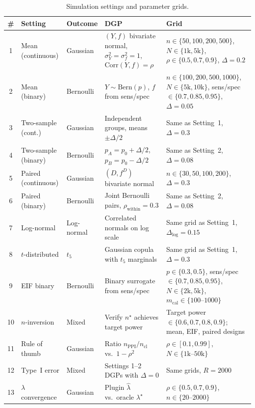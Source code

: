 \documentclass[11pt]{article}
\newcommand{\Corr}{\mathrm{Corr}}
\begin{document}
\begin{table}[!ht]
\centering\small
\begin{tabular}{|c|p{2.0cm}|p{1.8cm}|p{5.6cm}|p{3.2cm}|}
\hline
\textbf{\#} & \textbf{Setting} & \textbf{Outcome} & \textbf{DGP} &
  \textbf{Grid} \\
\hline
1 & Mean (continuous) & Gaussian &
  $(Y,f)$ bivariate normal, $\sigma_Y^2{=}\sigma_f^2{=}1$,
  $\Corr(Y,f){=}\rho$ &
  $n{\in}\{50,100,200,500\}$, $N{\in}\{1\text{k},5\text{k}\}$,
  $\rho{\in}\{0.5,0.7,0.9\}$, $\Delta{=}0.2$ \\
\hline
2 & Mean (binary) & Bernoulli &
  $Y{\sim}\text{Bern}(p)$, $f$ from sens/spec &
  $n{\in}\{100,200,500,1000\}$, $N{\in}\{5\text{k},10\text{k}\}$,
  sens/spec ${\in}\{0.7,0.85,0.95\}$, $\Delta{=}0.05$ \\
\hline
3 & Two-sample (cont.) & Gaussian &
  Independent groups, means $\pm\Delta/2$ &
  Same as Setting~1, $\Delta{=}0.3$ \\
\hline
4 & Two-sample (binary) & Bernoulli &
  $p_A{=}p_0{+}\Delta/2$, $p_B{=}p_0{-}\Delta/2$ &
  Same as Setting~2, $\Delta{=}0.08$ \\
\hline
5 & Paired (continuous) & Gaussian &
  $(D,f^D)$ bivariate normal &
  $n{\in}\{30,50,100,200\}$, $\Delta{=}0.3$ \\
\hline
6 & Paired (binary) & Bernoulli &
  Joint Bernoulli pairs, $\rho_{\text{within}}{=}0.3$ &
  Same as Setting~2, $\Delta{=}0.08$ \\
\hline
7 & Log-normal & Log-normal &
  Correlated normals on log scale &
  Same grid as Setting~1, $\Delta_{\log}{=}0.15$ \\
\hline
8 & $t$-distributed & $t_5$ &
  Gaussian copula with $t_5$ marginals &
  Same grid as Setting~1, $\Delta{=}0.3$ \\
\hline
9 & EIF binary & Bernoulli &
  Binary surrogate from sens/spec &
  $p{\in}\{0.3,0.5\}$, sens/spec ${\in}\{0.7,0.85,0.95\}$,
  $N{\in}\{2\text{k},5\text{k}\}$, $m_{\text{cal}}{\in}\{100\text{--}1000\}$ \\
\hline
10 & $n$-inversion & Mixed &
  Verify $n^\star$ achieves target power &
  Target power ${\in}\{0.6,0.7,0.8,0.9\}$;
  mean, EIF, paired designs \\
\hline
11 & Rule of thumb & Gaussian &
  Ratio $n_{\text{PPI}}/n_{\text{cl}}$ vs.\ $1{-}\rho^2$ &
  $\rho{\in}[0.1,0.99]$, $N{\in}\{1\text{k}\text{--}50\text{k}\}$ \\
\hline
12 & Type~I error & Mixed &
  Settings 1--2 DGPs with $\Delta{=}0$ &
  Same grids, $R{=}2000$ \\
\hline
13 & $\lambda$ convergence & Gaussian &
  Plugin $\hat\lambda$ vs.\ oracle $\lambda^\star$ &
  $\rho{\in}\{0.5,0.7,0.9\}$, $n{\in}\{20\text{--}2000\}$ \\
\hline
\end{tabular}
\caption{Simulation settings and parameter grids.}
\label{tab:simulation-settings}
\end{table}
\end{document}
